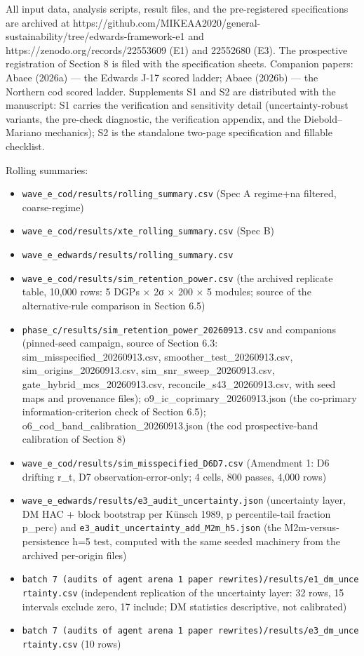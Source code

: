 \documentclass[11pt]{article}
\providecommand{\tightlist}{\setlength{\itemsep}{0.2em}\setlength{\parskip}{0pt}}
\begin{document}
All input data, analysis scripts, result files, and the pre-registered
specifications are archived at
https://github.com/MIKEAA2020/general-sustainability/tree/edwards-framework-e1
and https://zenodo.org/records/22553609 (E1) and 22552680 (E3). The
prospective registration of Section 8 is filed with the specification
sheets. Companion papers: Abaee (2026a) --- the Edwards J-17 scored
ladder; Abaee (2026b) --- the Northern cod scored ladder. Supplements S1
and S2 are distributed with the manuscript: S1 carries the verification
and sensitivity detail (uncertainty-robust variants, the pre-check
diagnostic, the verification appendix, and the Diebold--Mariano
mechanics); S2 is the standalone two-page specification and fillable
checklist.

Rolling summaries:

\begin{itemize}
\tightlist
\item
  \texttt{wave\_e\_cod/results/rolling\_summary.csv} (Spec A regime+na
  filtered, coarse-regime)
\item
  \texttt{wave\_e\_cod/results/xte\_rolling\_summary.csv} (Spec B)
\item
  \texttt{wave\_e\_edwards/results/rolling\_summary.csv}
\item
  \texttt{wave\_e\_cod/results/sim\_retention\_power.csv} (the archived
  replicate table, 10,000 rows: 5 DGPs × 2σ × 200 × 5 modules; source of
  the alternative-rule comparison in Section 6.5)
\item
  \texttt{phase\_c/results/sim\_retention\_power\_20260913.csv} and
  companions (pinned-seed campaign, source of Section 6.3:
  sim\_misspecified\_20260913.csv, smoother\_test\_20260913.csv,
  sim\_origins\_20260913.csv, sim\_snr\_sweep\_20260913.csv,
  gate\_hybrid\_mcs\_20260913.csv, reconcile\_s43\_20260913.csv, with
  seed maps and provenance files); o9\_ic\_coprimary\_20260913.json (the
  co-primary information-criterion check of Section 6.5);
  o6\_cod\_band\_calibration\_20260913.json (the cod prospective-band
  calibration of Section 8)
\item
  \texttt{wave\_e\_cod/results/sim\_misspecified\_D6D7.csv} (Amendment
  1: D6 drifting r\_t, D7 observation-error-only; 4 cells, 800 passes,
  4,000 rows)
\item
  \texttt{wave\_e\_edwards/results/e3\_audit\_uncertainty.json}
  (uncertainty layer, DM HAC + block bootstrap per Künsch 1989, p
  percentile-tail fraction p\_perc) and
  \texttt{e3\_audit\_uncertainty\_add\_M2m\_h5.json} (the
  M2m-versus-persistence h=5 test, computed with the same seeded
  machinery from the archived per-origin files)
\item
  \texttt{batch\ 7\ (audits\ of\ agent\ arena\ 1\ paper\ rewrites)/results/e1\_dm\_uncertainty.csv}
  (independent replication of the uncertainty layer: 32 rows, 15
  intervals exclude zero, 17 include; DM statistics descriptive, not
  calibrated)
\item
  \texttt{batch\ 7\ (audits\ of\ agent\ arena\ 1\ paper\ rewrites)/results/e3\_dm\_uncertainty.csv}
  (10 rows)
\end{itemize}
\end{document}
